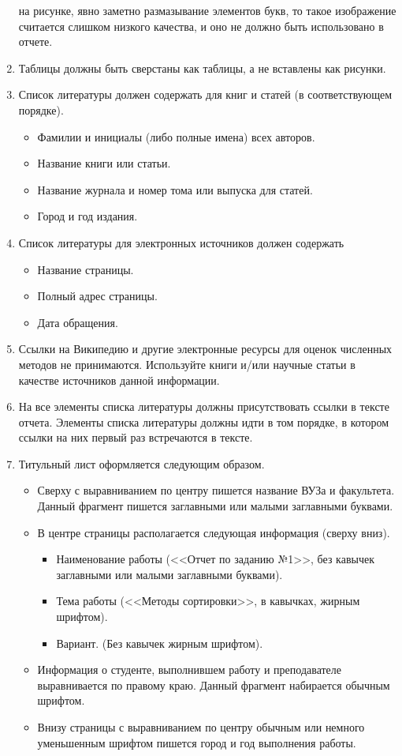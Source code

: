 \documentclass[a4paper,12pt,titlepage,final]{article}
\begin{document}
\begin{enumerate}
    на рисунке, явно заметно размазывание элементов букв, то такое изображение считается
    слишком низкого качества, и оно не должно быть использовано в отчете.
\item Таблицы должны быть сверстаны как таблицы, а не вставлены как рисунки.
\item Список литературы должен содержать для книг и статей (в соответствующем порядке).
    \begin{itemize}
    \item Фамилии и инициалы (либо полные имена) всех авторов.
    \item Название книги или статьи.
    \item Название журнала и номер тома или выпуска для статей.
    \item Город и год издания.
    \end{itemize}
\item Список литературы для электронных источников должен содержать
    \begin{itemize}
    \item Название страницы.
    \item Полный адрес страницы.
    \item Дата обращения.
    \end{itemize}
\item Ссылки на Википедию и другие электронные ресурсы для оценок численных 
    методов не принимаются. Используйте книги и/или научные статьи в качестве 
    источников данной информации.
\item На все элементы списка литературы должны присутствовать ссылки в тексте отчета. Элементы
    списка литературы должны идти в том порядке, в котором ссылки на них первый
    раз встречаются в тексте.
\item Титульный лист оформляется следующим образом.
    \begin{itemize}
    \item Сверху с выравниванием по центру пишется название ВУЗа и факультета. Данный
        фрагмент пишется заглавными или малыми заглавными буквами.
    \item В центре страницы располагается следующая информация (сверху вниз).
        \begin{itemize}
        \item Наименование работы (<<Отчет по заданию №1>>, без кавычек заглавными
            или малыми заглавными буквами).
        \item Тема работы (<<Методы сортировки>>, в кавычках, жирным шрифтом).
        \item Вариант. (Без кавычек жирным шрифтом).
        \end{itemize}
    \item Информация о студенте, выполнившем работу и преподавателе выравнивается
        по правому краю. Данный фрагмент набирается обычным шрифтом.
    \item Внизу страницы с выравниванием по центру обычным или немного уменьшенным
        шрифтом пишется город и год выполнения работы.
    \end{itemize}
\end{enumerate}
\end{document}
